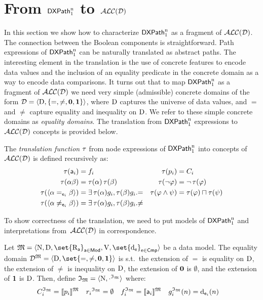 \section{From $\mathsf{DXPath}_{\rm 1}^{\rm n}$ to $\mathcal{ALC(D)}$}
\label{sec:xp-as-alcd}

In this section we show how to characterize $\mathsf{DXPath}_{\rm 1}^{\rm n}$ as a fragment of $\mathcal{ALC(D)}$.
The connection between the Boolean components is straightforward. Path expressions of $\mathsf{DXPath}_{\rm 1}^{\rm n}$ can be naturally translated as abstract paths.
The interesting element in the translation is the use of concrete features to encode data values and the inclusion of an equality predicate in the concrete domain as a way to encode data comparisons. It turns out that to map $\mathsf{DXPath}_{\rm 1}^{\rm n}$ as a fragment of $\mathcal{ALC(D)}$ we need very simple (admissible) concrete domains of the form $\mathcal{D} = \langle{\mathrm{D}, \{= , \neq, \mathbf{0}, \mathbf{1}\}}\rangle$, where $\mathrm{D}$ captures the universe of data values, and $=$ and $\neq$ capture equality and inequality on $\mathrm{D}$.
We refer to these simple concrete domains as \emph{equality domains}.
The translation from $\mathsf{DXPath}_{\rm 1}^{\rm n}$ expressions to $\mathcal{ALC(D)}$ concepts is provided below.

\begin{definition} \label{def:translation} 
    The \emph{translation function} $\operatorname{\tau}$ from node expressions of $\mathsf{DXPath}_{\rm 1}^{\rm n}$ into concepts of $\mathcal{ALC(D)}$ is defined recursively as:
    \begin{align*}
        \operatorname{\tau}(\mathsf{a}_i) &=f_i &   \operatorname{\tau}(p_i) &= C_i\\
        \operatorname{\tau}(\alpha\beta) &= \operatorname{\tau}(\alpha)\operatorname{\tau}(\beta) &       
        \operatorname{\tau}(\lnot \varphi) &= \lnot \operatorname{\tau}(\varphi) \\
        \operatorname{\tau}(\langle{\alpha =_{\mathsf{e}_i}    \beta}\rangle)&= \exists \operatorname{\tau}(\alpha)g_i, \operatorname{\tau}(\beta)g_i.{=}  &
        \operatorname{\tau}(\varphi \land \psi) &= \operatorname{\tau}(\varphi) \sqcap \operatorname{\tau}(\psi) \\
        \operatorname{\tau}(\langle{\alpha \neq_{\mathsf{e}_i}   \beta}\rangle)&= \exists \operatorname{\tau}(\alpha)g_i, \operatorname{\tau}(\beta)g_i.{\neq} 
    \end{align*}
\end{definition}

To show correctness of the translation, we need to put models of $\mathsf{DXPath}_{\rm 1}^{\rm n}$ and interpretations from~$\mathcal{ALC(D)}$ in correspondence.

\begin{definition} \label{def:model:as:interpretation}
    Let $\model= \tup{ \N, \D, \set{\R_{\apath}}_{\apath \in \mods}, \valuation,\set{\data_\cmp}_{\cmp \in \cmps} }$ be a data model. 
    The equality domain $\cdom^{\model} = \tup{\D, \set{=, \neq,\botpred, \toppred}}$ is s.t.\
        the extension of $=$ is equality on $\mathrm{D}$,
        the extension of $\neq$ is inequality on $\mathrm{D}$,
        the extension of $\mathbf{0}$ is $\emptyset$, and
        the extension of $\mathbf{1}$ is $\mathrm{D}$.
    Then, define $\mathfrak{I}_{\mathfrak{M}} = \langle{ \mathrm{N}, {\cdot^{\mathfrak{I}_{\mathfrak{M}}}}}\rangle$ where: 
    \begin{align*}
        {C}_{i}^{\mathfrak{I}_{\mathfrak{M}}} &= \llbracket{p_i}\rrbracket^{\mathfrak{M}} &
        {r_i}^{\mathfrak{I}_{\mathfrak{M}}} &= \emptyset &
        {f}_{i}^{\mathfrak{I}_{\mathfrak{M}}} &= \llbracket{\mathsf{a}_i}\rrbracket^{\mathfrak{M}} &
        {g}_{i}^{\mathfrak{I}_{\mathfrak{M}}}(n) &= \operatorname{d}_{\mathsf{e}_i}(n)
    \end{align*}
\end{definition}

